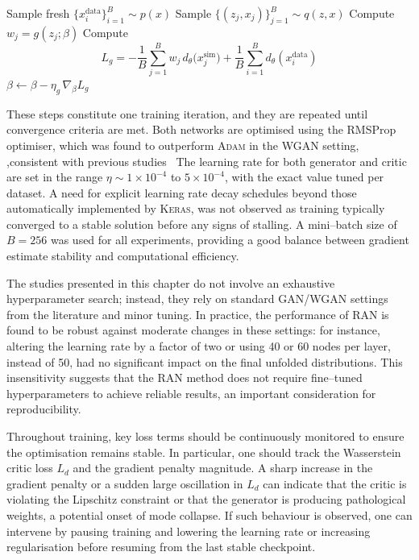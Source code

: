 {{\begin{algorithm}
                \State Sample fresh $\{x_i^{\text{data}}\}_{i=1}^B\sim p(x)$
                \State Sample $\{(z_j, x_j)\}_{j=1}^B\sim q(z, x)$
                \State Compute $w_j = g(z_j;\beta)$
                \State Compute
                \[
                  L_g 
                  = -\frac1B\sum_{j=1}^B w_j\,d_{\theta}\bigl(x_j^{\text{sim}}\bigr)
                    + \frac1B\sum_{i=1}^B d_{\theta}(x_i^{\text{data}})
                \]
                \State $\beta \leftarrow\beta - \eta_g\,\nabla_{\beta}L_g$
              \EndFor
            \EndFor
        \end{algorithm}
        These steps constitute one training iteration, and they are repeated until convergence criteria are met.
        Both networks are optimised using the RMSProp optimiser, which was found to outperform \textsc{Adam} in the WGAN setting, ,consistent with previous studies~\cite{henderson_where_2018}
        The learning rate for both generator and critic are set in the range $\eta \sim 1\times10^{-4}$ to $5\times10^{-4}$, with the exact value tuned per dataset.
        A need for explicit learning rate decay schedules beyond those automatically implemented by \textsc{Keras}, was not observed as training typically converged to a stable solution before any signs of stalling.
        A mini--batch size of $B=256$ was used for all experiments, providing a good balance between gradient estimate stability and computational efficiency.
        
        The studies presented in this chapter do not involve an exhaustive hyperparameter search; instead, they rely on standard GAN/WGAN settings from the literature and minor tuning.
        In practice, the performance of RAN is found to be robust against moderate changes in these settings: for instance, altering the learning rate by a factor of two or using 40 or 60 nodes per layer, instead of 50, had no significant impact on the final unfolded distributions.
        This insensitivity suggests that the RAN method does not require fine--tuned hyperparameters to achieve reliable results, an important consideration for reproducibility.
    
        Throughout training, key loss terms  should be continuously monitored to ensure the optimisation remains stable.
        In particular, one should track the Wasserstein critic loss $L_d$ and the gradient penalty magnitude.
        A sharp increase in the gradient penalty or a sudden large oscillation in $L_d$ can indicate that the critic is violating the Lipschitz constraint or that the generator is producing pathological weights, a potential onset of mode collapse.
        If such behaviour is observed, one can intervene by pausing training and lowering the learning rate or increasing regularisation before resuming from the last stable checkpoint.
        
}}
